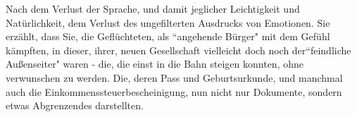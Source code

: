 Nach dem Verlust der Sprache, und damit jeglicher Leichtigkeit und Natürlichkeit, dem Verlust des ungefilterten Ausdrucks von Emotionen.\newline
Sie erzählt, dass Sie, die Geflüchteten, als ``angehende Bürger"{} mit dem Gefühl kämpften, in dieser, ihrer, neuen Gesellschaft vielleicht doch noch der``feindliche Außenseiter"{} waren - die, die einst in die Bahn steigen konnten, ohne verwunschen zu werden. Die, deren Pass und Geburtsurkunde, und manchmal auch die Einkommenssteuerbescheinigung, nun nicht nur Dokumente, sondern etwas Abgrenzendes darstellten.\newline
\newline



